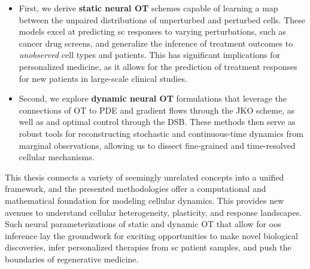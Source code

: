 \begin{itemize}[leftmargin=*]
	\item First, we derive \textbf{static neural \acrlong{OT}} schemes capable of learning a map between the unpaired distributions of unperturbed and perturbed cells. These models excel at predicting \acrlong{sc} responses to varying perturbations, such as cancer drug screens, and generalize the inference of treatment outcomes to \emph{unobserved} cell types and patients.
This has significant implications for personalized medicine, as it allows for the prediction of treatment responses for new patients in large-scale clinical studies.

	\item Second, we explore \textbf{dynamic neural \acrlong{OT}} formulations that leverage the connections of \acrshort{OT} to \acrlong{PDE} and gradient flows through the \acrlong{JKO} scheme, as well as  and optimal control through the \acrlong{DSB}. These methods then serve as robust tools for reconstructing stochastic and continuous-time dynamics from marginal observations, allowing us to dissect fine-grained and time-resolved cellular mechanisms.
\end{itemize}

This thesis connects a variety of seemingly unrelated concepts into a unified framework, and the presented methodologies offer a computational and mathematical foundation for modeling cellular dynamics. This provides new avenues to understand cellular heterogeneity, plasticity, and response landscapes.
Such neural parameterizations of static and dynamic \acrshort{OT} that allow for \acrlong{oos} inference lay the groundwork for exciting opportunities to make novel biological discoveries, infer personalized  therapies from \acrlong{sc} patient samples, and push the boundaries of regenerative medicine.

\endgroup

\cleardoublepage%

\begingroup
\let\clearpage\relax
\let\cleardoublepage\relax
\let\cleardoublepage\relax

